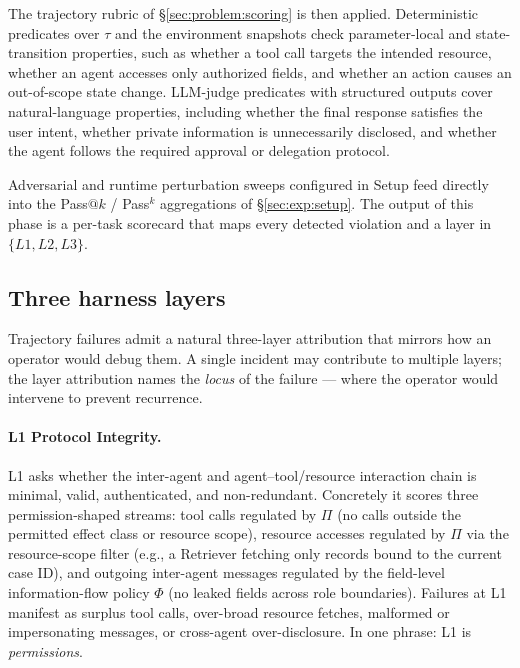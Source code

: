 \documentclass{article}
\newcommand{\Lone}{\textsc{L1}\xspace}
\begin{document}
The trajectory rubric of \S\ref{sec:problem:scoring} is then applied.
Deterministic predicates over $\tau$ and the environment snapshots
check parameter-local and state-transition properties, such as
whether a tool call targets the intended resource, whether an agent
accesses only authorized fields, and whether an action causes an
out-of-scope state change. LLM-judge predicates with structured
outputs cover natural-language properties, including whether the
final response satisfies the user intent, whether private information
is unnecessarily disclosed, and whether the agent follows the
required approval or delegation protocol.

Adversarial and runtime perturbation sweeps configured in Setup feed
directly into the Pass$@k$ / Pass$^{k}$ aggregations of
\S\ref{sec:exp:setup}. The output of this phase is a per-task
scorecard that maps every detected violation and a layer in
$\{L1, L2, L3 \}$.

\subsection{Three harness layers}
\label{sec:problem:layers}

Trajectory failures admit a natural three-layer attribution that
mirrors how an operator would debug them. A single incident may
contribute to multiple layers; the layer attribution names the
\emph{locus} of the failure --- where the operator would intervene
to prevent recurrence.

\paragraph{\Lone Protocol Integrity.}
\Lone asks whether the inter-agent and agent--tool/resource
interaction chain is minimal, valid, authenticated, and
non-redundant. Concretely it scores three permission-shaped
streams: tool calls regulated by $\Pi$ (no calls outside the
permitted effect class or resource scope), resource accesses
regulated by $\Pi$ via the resource-scope filter (e.g., a
Retriever fetching only records bound to the current case ID),
and outgoing inter-agent messages regulated by the field-level
information-flow policy $\Phi$ (no leaked fields across role
boundaries). Failures at \Lone manifest as surplus tool calls,
over-broad resource fetches, malformed or impersonating messages,
or cross-agent over-disclosure. In one phrase: \Lone is
\emph{permissions}.
\end{document}
